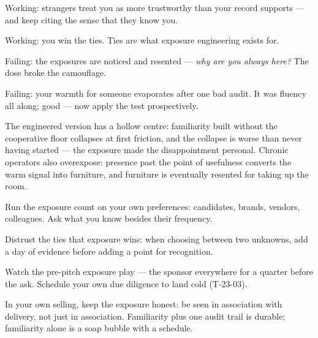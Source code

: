 \begin{feedback}
  \item Working: strangers treat you as more trustworthy than your record supports --- and keep citing the sense that they know you.
  \item Working: you win the ties. Ties are what exposure engineering exists for.
  \item Failing: the exposures are noticed and resented --- \emph{why are you always here?} The dose broke the camouflage.
  \item Failing: your warmth for someone evaporates after one bad audit. It was fluency all along; good --- now apply the test prospectively.
\end{feedback}
\begin{failure}
The engineered version has a hollow centre: familiarity built without the cooperative floor collapses at first friction, and the collapse is worse than never having started --- the exposure made the disappointment personal. Chronic operators also overexpose: presence past the point of usefulness converts the warm signal into furniture, and furniture is eventually resented for taking up the room.
\end{failure}
\begin{countermeasures}
  \item Run the exposure count on your own preferences: candidates, brands, vendors, colleagues. Ask what you know besides their frequency.
  \item Distrust the ties that exposure wins: when choosing between two unknowns, add a day of evidence before adding a point for recognition.
  \item Watch the pre-pitch exposure play --- the sponsor everywhere for a quarter before the ask. Schedule your own due diligence to land cold (T-23-03).
  \item In your own selling, keep the exposure honest: be seen in association with delivery, not just in association. Familiarity plus one audit trail is durable; familiarity alone is a soap bubble with a schedule.
\end{countermeasures}

\seesources
{}
